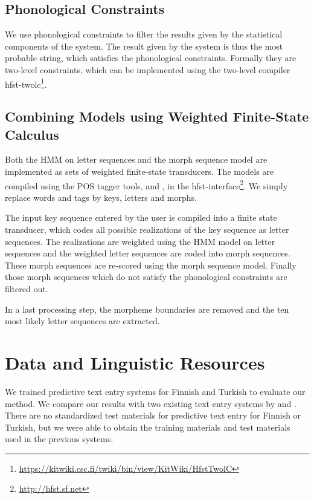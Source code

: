 \documentclass{llncs}
\begin{document}
\subsection{Phonological Constraints}

We use phonological constraints to filter the results given by the
statistical components of the system. The result given by the system
is thus the most probable string, which satisfies the phonological
constraints. Formally they are two-level constraints, which can be
implemented using the two-level compiler
hfst-twolc\footnote{\url{https://kitwiki.csc.fi/twiki/bin/view/KitWiki/HfstTwolC}}.

\subsection{Combining Models using Weighted Finite-State Calculus}

Both the HMM on letter sequences and the morph sequence model are
implemented as sets of weighted finite-state transducers. The models
are compiled using the POS tagger tools,
\cite{Silfverberg/2010/IceTal} and \cite{Silfverberg/2011}, in the
hfst-interface\footnote{\url{http://hfst.sf.net}}. We simply replace
words and tags by keys, letters and morphs.

The input key sequence entered by the user is compiled into a finite state
transducer, which codes all possible realizations of the key sequence
as letter sequences. The realizations are weighted using the HMM
model on letter sequences and the weighted letter sequences are coded
into morph sequences. These morph sequences are re-scored using the
morph sequence model. Finally those morph sequences which do not
satisfy the phonological constraints are filtered out. 

In a last processing step, the morpheme boundaries are removed and the
ten most likely letter sequences are extracted.

\section{Data and Linguistic Resources}\label{data}

We trained predictive text entry systems for Finnish and Turkish to
evaluate our method. We compare our results with two existing text
entry systems by \cite{silfverberg/2011/cla} and
\cite{Tantug:2010}. There are no standardized test materials for
predictive text entry for Finnish or Turkish, but we were able to
obtain the training materials and test materials used in the previous
systems.
\end{document}
